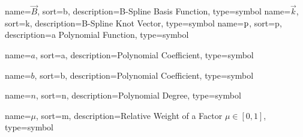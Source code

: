 	{%
		name=\ensuremath{\vec{B}},
		sort=b,
		description=B-Spline Basis Function,
		type=symbol
	}
	\newcommand{\bspline}{\gls{sym:bspline}}
	{%
		name=\ensuremath{\vec{k}},
		sort=k,
		description=B-Spline Knot Vector,
		type=symbol
	}
	\newcommand{\knot}{\gls{sym:knot}}
	{%
		name=\ensuremath{\func{p}},
		sort=p,
		description=a Polynomial Function,
		type=symbol
	}
	\newcommand{\polynomial}{\gls{sym:polynomial}}

	{%
		name=\ensuremath{a},
		sort=a,
		description=Polynomial Coefficient,
		type=symbol
	}
	\newcommand{\coefficient}{\gls{sym:coefficient}}

	{%
		name=\ensuremath{b},
		sort=b,
		description=Polynomial Coefficient,
		type=symbol
	}
	\newcommand{\coefficientb}{\gls{sym:coefficientb}}

	{%
		name=\ensuremath{n},
		sort=n,
		description=Polynomial Degree,
		type=symbol
	}
	\newcommand{\poldeg}{\gls{sym:poldeg}}

	{%
		name=\ensuremath{\mu},
		sort=m,
		description=Relative Weight of a Factor \ensuremath{\mu \in [0, 1]},
		type=symbol
	}
	\newcommand{\relweight}{\gls{sym:relweight}}

